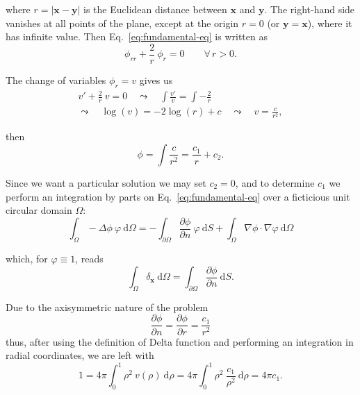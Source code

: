where $r=\left| \mathbf{x}-\mathbf{y} \right|$ is the Euclidean distance between $\mathbf{x}$ and $\mathbf{y}$. The right-hand side vanishes at all points of the plane, except at the origin $r=0$ (or $\mathbf{y}=\mathbf{x}$), where it has infinite value. Then Eq.~\eqref{eq:fundamental-eq} is written as
\begin{equation*}
\phi_{rr} + \frac{2}{r}\ \phi_r = 0 \qquad \forall\, r>0.
\end{equation*}

The change of variables $\phi_r=v$ gives us 
\begin{equation*}
\begin{gathered}
v' + \frac{2}{r}\ v = 0 \quad \leadsto \quad \int \frac{v'}{v}= \int -\frac{2}{r}  \\ \leadsto \quad \log(v) =-2\log(r)+c \quad \leadsto \quad v=\frac{c}{r^2}  ,  
\end{gathered}
\end{equation*}

then 
\begin{equation*}
\phi=\int \frac{c}{r^2} = \frac{c_1}{r} +c_2.
\end{equation*}

Since we want a particular solution we may set $c_2=0$, and to determine $c_1$ we perform an integration by parts on Eq.~\eqref{eq:fundamental-eq} over a ficticious unit circular domain $\Omega$:
\begin{equation*}
\int_\Omega -\Delta \phi\ \varphi \ \mathrm{d}\Omega = -\int_{\partial\Omega}\frac{\partial \phi}{\partial n}\ \varphi \ \mathrm{d}S+\int_\Omega \nabla \phi \cdot \nabla \varphi \ \mathrm{d}\Omega
\end{equation*}

which, for $\varphi\equiv 1$, reads
\begin{equation*}
\int_\Omega \delta_\mathbf{x}\ \mathrm{d}\Omega = \int_{\partial\Omega}\frac{\partial \phi}{\partial n} \ \mathrm{d}S.
\end{equation*}

Due to the axisymmetric nature of the problem
\begin{equation*}
\frac{\partial \phi}{\partial n}=\frac{\partial \phi}{\partial r} = \frac{c_1}{r^2}
\end{equation*}
thus, after using the definition of Delta function and performing an integration in radial coordinates, we are left with
\begin{equation*}
1=4\pi \int_0^1 \rho^2\ v(\rho) \ \mathrm{d}\rho = 4\pi \int_0^1 \rho^2\ \frac{c_1}{\rho^2} \ \mathrm{d}\rho =4\pi c_1.
\end{equation*}


